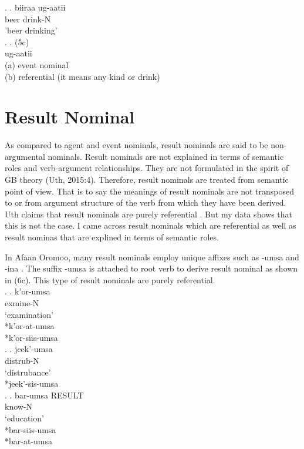 \documentclass[11pt,a4paper]{article}
\begin{document}
\ex.
\ag.
biiraa ug-aatii \\
beer drink-N\\
'beer drinking'\\

\ex.
\ag.
(5c)\\
ug-aatii\\
(a) event nominal \\
(b) referential (it means any kind or drink)\\

\section{Result Nominal}
As compared to agent and event nominals, result nominals are said to be non-argumental nominals. Result nominals are not explained in terms of semantic roles and verb-argument relationships. They are not formulated in the spirit of GB theory (Uth, 2015:4). Therefore, result nominals are treated from semantic point of view. That is to say the meanings of result nominals are not transposed to or from argument structure of the verb from which they have been derived. Uth claims that result nominals are purely  referential \cite[p-4]{uth2015event}. But my data shows that this is not the case. I came across result nominals which are referential as well as result nominas that are explined in terms of semantic roles. 

In Afaan Oromoo, many result nominals employ unique affixes such as -umsa and -ina \cite{gaddisa2001,temesgen1985,tolemariam2011}. The suffix -umsa is attached to root verb to derive result nominal as shown in (6c). This type of result nominals are purely referential. \\

\ex.
\ag.
k'or-umsa\\
exmine-N\\
‘examination’\\
*k'or-at-umsa\\
*k'or-siis-umsa\\

\ex.
\ag.
jeek'-umsa\\
distrub-N\\
‘distrubance’\\
*jeek'-sis-umsa\\

\ex.
\ag.
bar-umsa RESULT\\
know-N\\
‘education’\\
*bar-siis-umsa\\
*bar-at-umsa\\
\end{document}
